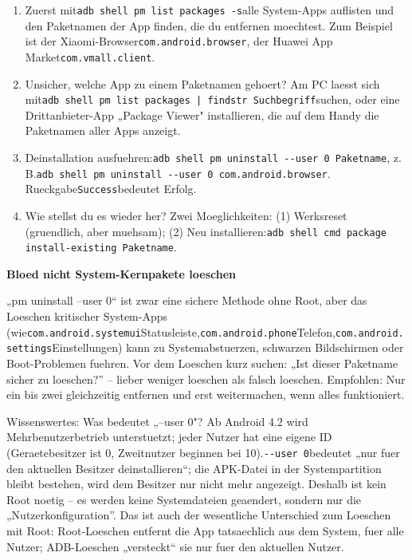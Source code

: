 \begin{enumerate}
  \item Zuerst mit\texttt{adb shell pm list packages -\allowbreak s}alle System-Apps auflisten und den Paketnamen der App finden, die du entfernen moechtest. Zum Beispiel ist der Xiaomi-Browser\texttt{com.\allowbreak android.\allowbreak browser}, der Huawei App Market\texttt{com.\allowbreak vmall.\allowbreak client}.
  \item Unsicher, welche App zu einem Paketnamen gehoert? Am PC laesst sich mit\texttt{adb shell pm list packages | findstr Suchbegriff}suchen, oder eine Drittanbieter-App „Package Viewer" installieren, die auf dem Handy die Paketnamen aller Apps anzeigt.
  \item Deinstallation ausfuehren:\texttt{adb shell pm uninstall -\allowbreak -\allowbreak user 0 Paketname}, z. B.\texttt{adb shell pm uninstall -\allowbreak -\allowbreak user 0 com.\allowbreak android.\allowbreak browser}. Rueckgabe\texttt{Success}bedeutet Erfolg.
  \item Wie stellst du es wieder her? Zwei Moeglichkeiten: (1) Werksreset (gruendlich, aber muehsam); (2) Neu installieren:\texttt{adb shell cmd package install-\allowbreak existing Paketname}.
\end{enumerate}

\textbf{Bloed nicht System-Kernpakete loeschen}\par

„pm uninstall --user 0“ ist zwar eine sichere Methode ohne Root, aber das Loeschen kritischer System-Apps (wie\texttt{com.\allowbreak android.\allowbreak systemui}Statusleiste,\texttt{com.\allowbreak android.\allowbreak phone}Telefon,\texttt{com.\allowbreak android.\allowbreak settings}Einstellungen) kann zu Systemabstuerzen, schwarzen Bildschirmen oder Boot-Problemen fuehren. Vor dem Loeschen kurz suchen: „Ist dieser Paketname sicher zu loeschen?” – lieber weniger loeschen als falsch loeschen. Empfohlen: Nur ein bis zwei gleichzeitig entfernen und erst weitermachen, wenn alles funktioniert.

\begin{tcbinfo}{Wissenswertes: Was bedeutet „--user 0"?}
Ab Android 4.2 wird Mehrbenutzerbetrieb unterstuetzt; jeder Nutzer hat eine eigene ID (Geraetebesitzer ist 0, Zweitnutzer beginnen bei 10).\texttt{-\allowbreak -\allowbreak user 0}bedeutet „nur fuer den aktuellen Besitzer deinstallieren“; die APK-Datei in der Systempartition bleibt bestehen, wird dem Besitzer nur nicht mehr angezeigt. Deshalb ist kein Root noetig – es werden keine Systemdateien geaendert, sondern nur die „Nutzerkonfiguration”. Das ist auch der wesentliche Unterschied zum Loeschen mit Root: Root-Loeschen entfernt die App tatsaechlich aus dem System, fuer alle Nutzer; ADB-Loeschen „versteckt“ sie nur fuer den aktuellen Nutzer.

\end{tcbinfo}


